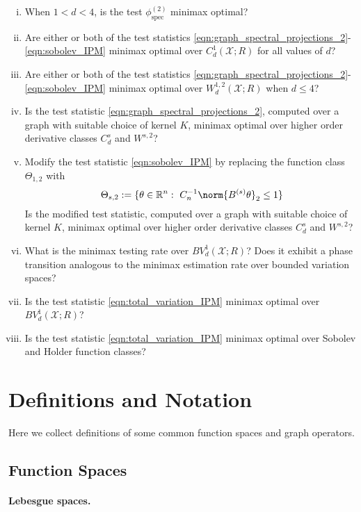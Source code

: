 \documentclass{article}
\newcommand{\Reals}{\mathbb{R}}
\newcommand{\1}{\mathbf{1}}
\newcommand{\spec}{\mathrm{spec}}
\theoremstyle{alden}
\theoremstyle{aldenthm}
\theoremstyle{definition}
\theoremstyle{remark}
\begin{document}
\begin{enumerate}[(i)]
	\item When $1 < d < 4$, is the test $\phi_{\spec}^{(2)}$ minimax optimal?
	\item Are either or both of the test statistics \eqref{eqn:graph_spectral_projections_2}-\eqref{eqn:sobolev_IPM} minimax optimal over $C_d^1(\mathcal{X};R)$ for all values of $d$?
	\item Are either or both of the test statistics \eqref{eqn:graph_spectral_projections_2}-\eqref{eqn:sobolev_IPM} minimax optimal over $W_d^{1,2}(\mathcal{X};R)$ when $d \leq 4$?
	\item Is the test statistic \eqref{eqn:graph_spectral_projections_2}, computed over a graph with suitable choice of kernel $K$, minimax optimal over higher order derivative classes $C_d^s$ and $W^{s,2}$? 
	\item Modify the test statistic \eqref{eqn:sobolev_IPM} by replacing the function class $\Theta_{1,2}$ with
	\begin{equation}
	\Theta_{s,2} := \{\theta \in \Reals^n:~ C_n^{-1} \norm{B^{(s)}\theta}_2 \leq 1\} 
	\end{equation}
	Is the modified test statistic, computed over a graph with suitable choice of kernel $K$, minimax optimal over higher order derivative classes $C_d^s$ and $W^{s,2}$?
	\item What is the minimax testing rate over $BV_d^{1}(\mathcal{X};R)$? Does it exhibit a phase transition analogous to the minimax estimation rate over bounded variation spaces?
	\item Is the test statistic \eqref{eqn:total_variation_IPM} minimax optimal over $BV_d^{1}(\mathcal{X};R)$?
	\item Is the test statistic \eqref{eqn:total_variation_IPM} minimax optimal over Sobolev and Holder function classes?
\end{enumerate}

\section{Definitions and Notation}

Here we collect definitions of some common function spaces and graph operators.

\subsection{Function Spaces}

\paragraph{Lebesgue spaces.}
\end{document}
